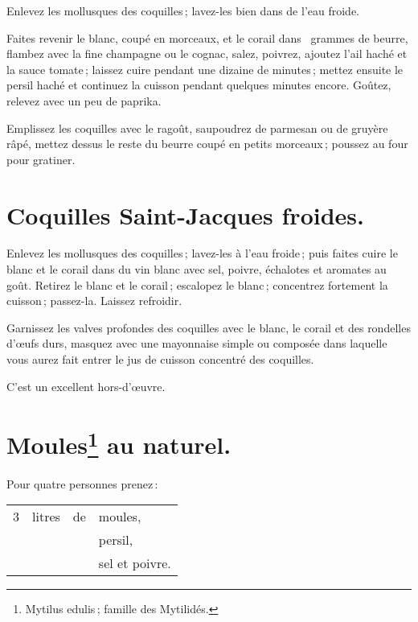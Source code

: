 Enlevez les mollusques des coquilles ; lavez-les bien dans de l'eau froide.

Faites revenir le blanc, coupé en morceaux, et le corail dans {\mmm} grammes de
beurre, flambez avec la fine champagne ou le cognac, salez, poivrez, ajoutez
l'ail haché et la sauce tomate ; laissez cuire pendant une dizaine de minutes ;
mettez ensuite le persil haché et continuez la cuisson pendant quelques minutes
encore. Goûtez, relevez avec un peu de paprika.

Emplissez les coquilles avec le ragoût, saupoudrez de parmesan ou de gruyère
râpé, mettez dessus le reste du beurre coupé en petits morceaux ; poussez au
four pour gratiner.

\section*{\centering Coquilles Saint-Jacques froides.}

Enlevez les mollusques des coquilles ; lavez-les à l'eau froide ; puis faites
cuire le blanc et le corail dans du vin blanc avec sel, poivre, échalotes et
aromates au goût. Retirez le blanc et le corail ; escalopez le blanc ;
concentrez fortement la cuisson ; passez-la. Laissez refroidir.

Garnissez les valves profondes des coquilles avec le blanc, le corail et des
rondelles d'œufs durs, masquez avec une mayonnaise simple ou composée dans
laquelle vous aurez fait entrer le jus de cuisson concentré des coquilles.

C'est un excellent hors-d'œuvre.

\section*{\centering Moules\footnote{Mytilus edulis ; famille des Mytilidés.} au naturel.}

Pour quatre personnes prenez :

\medskip

\footnotesize
\begin{longtable}{rrrp{16em}}
      3 & litres & de & moules,                                                                           \\
        &        &    & persil,                                                                           \\
        &        &    & sel et poivre.                                                                    \\
\end{longtable}
\normalsize

